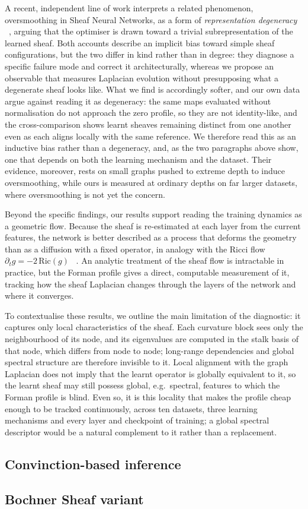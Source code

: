 A recent, independent line of work interprets a related phenomenon,
oversmoothing in Sheaf Neural Networks, as a form of \emph{representation
degeneracy} ~\cite{donmez2026oversmoothingrepresentationdegeneracyneural}, arguing that the optimiser is drawn toward a
trivial subrepresentation of the learned sheaf. Both accounts describe an
implicit bias toward simple sheaf configurations, but the two differ in kind
rather than in degree: they diagnose a specific failure mode and correct it
architecturally, whereas we propose an observable that measures Laplacian
evolution without presupposing what a degenerate sheaf looks like. What we
find is accordingly softer, and our own data argue against reading it as
degeneracy: the same maps evaluated without normalisation do not approach the
zero profile, so they are not identity-like, and the cross-comparison shows
learnt sheaves remaining distinct from one another even as each aligns locally
with the same reference. We therefore read this as an inductive bias rather than a
degeneracy, and, as the two paragraphs above show, one that depends on both
the learning mechanism and the dataset. Their evidence, moreover, rests on
small graphs pushed to extreme depth to induce oversmoothing, while ours is
measured at ordinary depths on far larger datasets, where oversmoothing is not
yet the concern.

Beyond the specific findings, our results support reading the training
dynamics as a geometric flow. Because the sheaf is re-estimated at each layer from the current
features, the network is better described as a process that deforms the
geometry than as a diffusion with a fixed operator, in analogy with the Ricci
flow $\partial_t g = -2\,\mathrm{Ric}(g)$ ~\cite{Hamilton1982ThreemanifoldsWP}. An
analytic treatment of the sheaf flow is intractable in practice, but the
Forman profile gives a direct, computable measurement of it, tracking how the
sheaf Laplacian changes through the layers of the network and where it
converges.

To contextualise these results, we outline the main limitation of the
diagnostic: it captures only local characteristics of the sheaf. Each
curvature block sees only the neighbourhood of its node, and its eigenvalues
are computed in the stalk basis of that node, which differs from node to
node; long-range dependencies and global spectral structure are therefore
invisible to it. Local alignment with the graph Laplacian does not imply that
the learnt operator is globally equivalent to it, so the learnt sheaf may
still possess global, e.g.\ spectral, features to which the Forman profile is
blind. Even so, it is this locality that makes the profile cheap
enough to be tracked continuously, across ten datasets, three learning
mechanisms and every layer and checkpoint of training; a global spectral
descriptor would be a natural complement to it rather than a replacement.

\subsection{Convinction-based inference}

\subsection{Bochner Sheaf variant}







